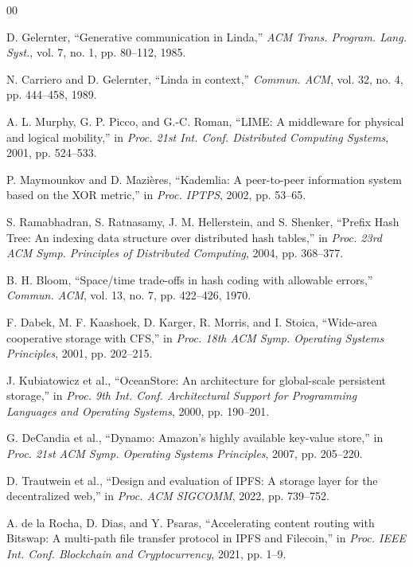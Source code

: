 \documentclass[conference]{IEEEtran}
\begin{document}
\begin{thebibliography}{00}

D. Gelernter, ``Generative communication in Linda,'' \emph{ACM Trans.
Program. Lang. Syst.}, vol. 7, no. 1, pp. 80--112, 1985.

N. Carriero and D. Gelernter, ``Linda in context,'' \emph{Commun. ACM},
vol. 32, no. 4, pp. 444--458, 1989.

A. L. Murphy, G. P. Picco, and G.-C. Roman, ``LIME: A middleware for
physical and logical mobility,'' in \emph{Proc. 21st Int. Conf. Distributed
Computing Systems}, 2001, pp. 524--533.

P. Maymounkov and D. Mazi\`eres, ``Kademlia: A peer-to-peer information
system based on the XOR metric,'' in \emph{Proc. IPTPS}, 2002, pp. 53--65.

S. Ramabhadran, S. Ratnasamy, J. M. Hellerstein, and S. Shenker,
``Prefix Hash Tree: An indexing data structure over distributed hash
tables,'' in \emph{Proc. 23rd ACM Symp. Principles of Distributed Computing},
2004, pp. 368--377.

B. H. Bloom, ``Space/time trade-offs in hash coding with allowable
errors,'' \emph{Commun. ACM}, vol. 13, no. 7, pp. 422--426, 1970.

F. Dabek, M. F. Kaashoek, D. Karger, R. Morris, and I. Stoica,
``Wide-area cooperative storage with CFS,'' in \emph{Proc. 18th ACM Symp.
Operating Systems Principles}, 2001, pp. 202--215.

J. Kubiatowicz et al., ``OceanStore: An architecture for global-scale
persistent storage,'' in \emph{Proc. 9th Int. Conf. Architectural Support for
Programming Languages and Operating Systems}, 2000, pp. 190--201.

G. DeCandia et al., ``Dynamo: Amazon's highly available key-value store,''
in \emph{Proc. 21st ACM Symp. Operating Systems Principles}, 2007,
pp. 205--220.

D. Trautwein et al., ``Design and evaluation of IPFS: A storage layer for
the decentralized web,'' in \emph{Proc. ACM SIGCOMM}, 2022, pp. 739--752.

A. de la Rocha, D. Dias, and Y. Psaras, ``Accelerating content routing with
Bitswap: A multi-path file transfer protocol in IPFS and Filecoin,'' in
\emph{Proc. IEEE Int. Conf. Blockchain and Cryptocurrency}, 2021, pp. 1--9.


\end{thebibliography}
\end{document}
